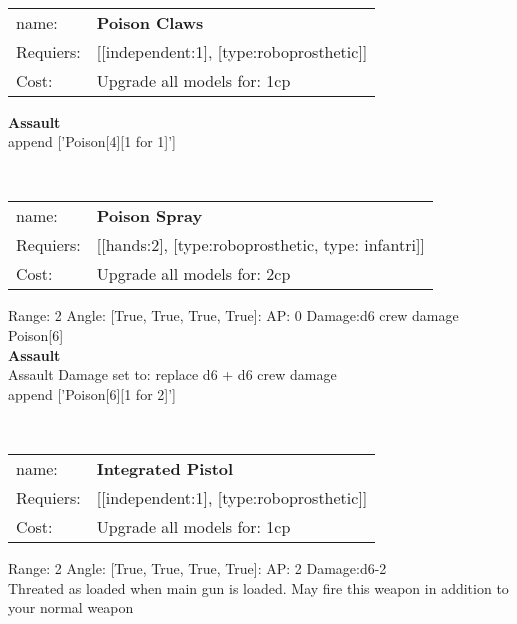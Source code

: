 \ \\
\begin{tabular}{ll}
name: & {\bf Poison Claws } \\
Requiers: & [[independent:1], [type:roboprosthetic]] \\
Cost: & Upgrade all models for: 1cp \\
\end{tabular}





{\bf Assault} \ \\

append ['Poison[4][1 for 1]']


\ \\
\begin{tabular}{ll}
name: & {\bf Poison Spray } \\
Requiers: & [[hands:2], [type:roboprosthetic, type: infantri]] \\
Cost: & Upgrade all models for: 2cp \\
\end{tabular}



Range: 2  Angle: [True, True, True, True]: AP: 0 Damage:d6 crew damage \\
Poison[6]\\ 



{\bf Assault} \ \\
Assault Damage set to: replace d6 + d6 crew damage
\\ 

append ['Poison[6][1 for 2]']


\ \\
\begin{tabular}{ll}
name: & {\bf Integrated Pistol } \\
Requiers: & [[independent:1], [type:roboprosthetic]] \\
Cost: & Upgrade all models for: 1cp \\
\end{tabular}



Range: 2  Angle: [True, True, True, True]: AP: 2 Damage:d6-2 \\
Threated as loaded when main gun is loaded. May fire this weapon in addition to your normal weapon\\ 








